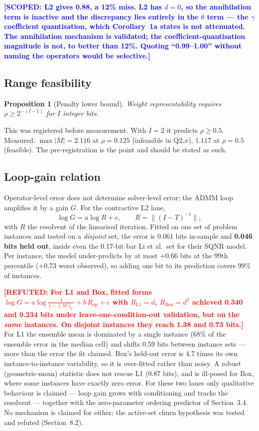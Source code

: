 \documentclass[11pt,a4paper]{article}
\newtheorem{proposition}{Proposition}
\newcommand{\scoped}[1]{\textcolor{blue}{\textbf{[SCOPED: #1]}}}
\newcommand{\refuted}[1]{\textcolor{red}{\textbf{[REFUTED: #1]}}}
\begin{document}
\scoped{L2 gives 0.88, a 12\% miss. L2 has $d = 0$, so the annihilation term is
inactive and the discrepancy lies entirely in the $\theta$ term --- the
$\gamma$ coefficient quantisation, which Corollary~1a states is not attenuated.
The annihilation mechanism is validated; the coefficient-quantisation
magnitude is not, to better than 12\%. Quoting ``0.99--1.00'' without naming
the operators would be selective.}

\subsection{Range feasibility}

\begin{proposition}[Penalty lower bound]
Weight representability requires $\rho \ge 2^{-(I-1)}$ for $I$ integer bits.
\end{proposition}

This was registered before measurement. With $I = 2$ it predicts $\rho \ge
0.5$. Measured: $\max|M| = 2.116$ at $\rho = 0.125$ (infeasible in Q2.$x$),
$1.117$ at $\rho = 0.5$ (feasible). The pre-registration is the point and
should be stated as such.

\subsection{Loop-gain relation}

Operator-level error does not determine solver-level error; the ADMM loop
amplifies it by a gain $G$. For the contractive L2 lane,
\begin{equation}
\log G = a \log R + c, \qquad R = \lVert (I-T)^{-1} \rVert,
\end{equation}
with $R$ the resolvent of the linearised iteration. Fitted on one set of
problem instances and tested on a \emph{disjoint} set, the error is 0.061 bits
in-sample and \textbf{0.046 bits held out}, inside even the 0.17-bit bar Li et
al.\ set for their SQNR model. Per instance, the model under-predicts by at
most $+0.66$ bits at the 99th percentile ($+0.73$ worst observed), so adding one
bit to its prediction covers 99\% of instances.

\refuted{For L1 and Box, fitted forms $\log G = a\log\frac{1}{1-\lVert M\rVert_2} +
b\,R_{\text{op}} + c$ with $R_{\text{L1}} = d$, $R_{\text{Box}} = d^2$ achieved
0.340 and 0.234 bits under leave-one-condition-out validation, but on the
\emph{same} instances. On disjoint instances they reach 1.38 and 0.73 bits.} For
L1 the ensemble mean is dominated by a single instance (68\% of the ensemble
error in the median cell) and shifts 0.59 bits between instance sets --- more
than the error the fit claimed. Box's held-out error is 4.7 times its own
instance-to-instance variability, so it is over-fitted rather than noisy. A
robust (geometric-mean) statistic does not rescue L1 (0.87 bits), and is
ill-posed for Box, where some instances have exactly zero error. For these two
lanes only qualitative behaviour is claimed --- loop gain grows with
conditioning and tracks the resolvent --- together with the zero-parameter
ordering predictor of Section~3.4. No mechanism is claimed for either; the
active-set churn hypothesis was tested and refuted (Section~8.2).
\end{document}
